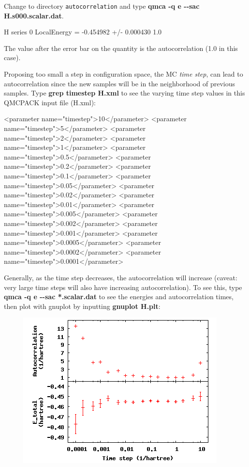 Change to directory \texttt{autocorrelation} and type \textbf{qmca -q e
{-}{-}sac H.s000.scalar.dat}.  

\begin{shade} 
H  series 0  LocalEnergy = -0.454982 +/- 0.000430    1.0 
\end{shade}

The value after the error bar on the quantity is the autocorrelation (1.0 in
this case).

Proposing too small a step in configuration space, the MC \textit{time step},
can lead to autocorrelation since the new samples will be in the neighborhood
of previous samples.  Type \textbf{grep timestep H.xml} to see the varying time
step values in this QMCPACK input file (H.xml):

\begin{shade} 
<parameter name="timestep">10</parameter>
<parameter name="timestep">5</parameter> 
<parameter name="timestep">2</parameter> 
<parameter name="timestep">1</parameter>
<parameter name="timestep">0.5</parameter> 
<parameter name="timestep">0.2</parameter> 
<parameter name="timestep">0.1</parameter>
<parameter name="timestep">0.05</parameter> 
<parameter name="timestep">0.02</parameter> 
<parameter name="timestep">0.01</parameter>
<parameter name="timestep">0.005</parameter> 
<parameter name="timestep">0.002</parameter> 
<parameter name="timestep">0.001</parameter>
<parameter name="timestep">0.0005</parameter> 
<parameter name="timestep">0.0002</parameter> 
<parameter name="timestep">0.0001</parameter> 
\end{shade}

Generally, as the time step decreases, the autocorrelation will increase
(caveat: very large time steps will also have increasing autocorrelation). To
see this, type \textbf{qmca -q e {-}{-}sac *.scalar.dat} to see the energies
and autocorrelation times, then plot with gnuplot by inputting \textbf{gnuplot
H.plt}:

\FloatBarrier
\begin{figure}[ht!]
\begin{center}
\includegraphics[trim = 0mm 0mm 0mm 0mm, clip,width=0.75\columnwidth]{figures/lab_qmc_statistics_blocking1.png}
\end{center}
\end{figure}
\FloatBarrier

